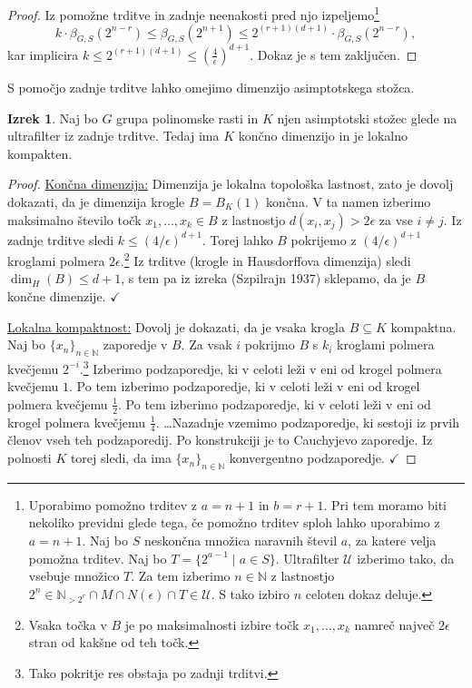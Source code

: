\documentclass[11pt]{book}
\def\NN{\mathbb{N}}
\def\UU{\mathcal{U}}
\def\literatura{\color{modra}}
\def\kljuka{$\checkmark$}
\theoremstyle{definition}
\theoremstyle{zgled}
\theoremstyle{odprtproblem}
\theoremstyle{domacanaloga}
\newenvironment{dokaz}
    {\color{siva}\begin{proof}}
    {\end{proof}}
\theoremstyle{izrek}
\newtheorem*{izrek}{Izrek}
\begin{document}
\begin{dokaz}
Iz pomožne trditve in zadnje neenakosti pred njo izpeljemo\footnote{Uporabimo pomožno trditev z $a = n+1$ in $b = r+1$. Pri tem moramo biti nekoliko previdni glede tega, če pomožno trditev sploh lahko uporabimo z $a = n+1$. Naj bo $S$ neskončna množica naravnih števil $a$, za katere velja pomožna trditev. Naj bo $T = \{ 2^{a-1} \mid a \in S \}$. Ultrafilter $\UU$ izberimo tako, da vsebuje množico $T$. Za tem izberimo $n \in \NN$ z lastnostjo $2^n \in \NN_{> 2^r} \cap M \cap N(\epsilon) \cap T \in \UU$. S tako izbiro $n$ celoten dokaz deluje.}
\[
k \cdot \beta_{G,S}(2^{n-r}) \leq \beta_{G,S}(2^{n+1}) \leq 2^{(r+1)(d+1)} \cdot \beta_{G,S}(2^{n-r}),
\]
kar implicira $k \leq 2^{(r+1)(d+1)} \leq \left( \frac{4}{\epsilon} \right)^{d+1}$. Dokaz je s tem zaključen.
\end{dokaz}

S pomočjo zadnje trditve lahko omejimo dimenzijo asimptotskega stožca.

\begin{izrek}
Naj bo $G$ grupa polinomske rasti in $K$ njen asimptotski stožec glede na ultrafilter iz zadnje trditve. Tedaj ima $K$ končno dimenzijo in je lokalno kompakten.
\end{izrek}

\begin{dokaz}
\underline{Končna dimenzija:} Dimenzija je lokalna topološka lastnost, zato je dovolj dokazati, da je dimenzija krogle $B = B_K(1)$ končna. V ta namen izberimo maksimalno število točk $x_1, \dots, x_k \in B$ z lastnostjo $d(x_i, x_j) > 2 \epsilon$ za vse $i \neq j$. Iz zadnje trditve sledi $k \leq ( 4/\epsilon )^{d+1}$. Torej lahko $B$ pokrijemo z $(4/\epsilon)^{d+1}$ kroglami polmera $2 \epsilon$.\footnote{Vsaka točka v $B$ je po maksimalnosti izbire točk $x_1, \dots, x_k$ namreč največ $2\epsilon$ stran od kakšne od teh točk.} Iz trditve {\sc (krogle in Hausdorffova dimenzija)} sledi $\dim_H(B) \leq d+1$, s tem pa iz izreka {\literatura (Szpilrajn 1937)} sklepamo, da je $B$ končne dimenzije. \kljuka

\underline{Lokalna kompaktnost:} Dovolj je dokazati, da je vsaka krogla $B \subseteq K$ kompaktna. Naj bo $\{ x_n \}_{n \in \NN}$ zaporedje v $B$. Za vsak $i$ pokrijmo $B$ s $k_i$ kroglami polmera kvečjemu $2^{-i}$.\footnote{Tako pokritje res obstaja po zadnji trditvi.} Izberimo podzaporedje, ki v celoti leži v eni od krogel polmera kvečjemu $1$. Po tem izberimo podzaporedje, ki v celoti leži v eni od krogel polmera kvečjemu $\frac12$. Po tem izberimo podzaporedje, ki v celoti leži v eni od krogel polmera kvečjemu $\frac14$. \dots Nazadnje vzemimo podzaporedje, ki sestoji iz prvih členov vseh teh podzaporedij. Po konstrukciji je to Cauchyjevo zaporedje. Iz polnosti $K$ torej sledi, da ima $\{ x_n \}_{n \in \NN}$ konvergentno podzaporedje. \kljuka
\end{dokaz}
\end{document}
